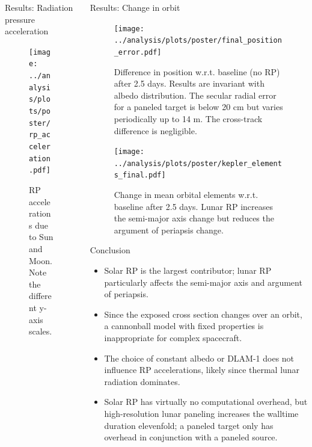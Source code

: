 \documentclass[final,20pt]{beamer}
\begin{document}
\begin{frame}[t]
\begin{columns}[t]
\begin{column}{\colwidth}
\begin{block}{Results: Radiation pressure acceleration}
    \begin{figure}[h]
      \centering
      \texttt{[image: ../analysis/plots/poster/rp\_acceleration.pdf]}
      \caption{RP accelerations due to Sun and Moon. Note the different y-axis scales.}
      \label{fig:acc}
    \end{figure}

  \end{block}

\end{column}

\separatorcolumn

\begin{column}{\colwidth}

  \begin{alertblock}{Results: Change in orbit}

    \begin{figure}[h]
      \centering
      \texttt{[image: ../analysis/plots/poster/final\_position\_error.pdf]}
      \caption{Difference in position w.r.t. baseline (no RP) after 2.5 days. Results are invariant with albedo distribution. The secular radial error for a paneled target is below 20 cm but varies periodically up to 14 m. The cross-track difference is negligible. }
      \label{fig:error}
    \end{figure}
    \begin{figure}[h]
      \centering
      \texttt{[image: ../analysis/plots/poster/kepler\_elements\_final.pdf]}
      \caption{Change in mean orbital elements w.r.t. baseline after 2.5 days. Lunar RP increases the semi-major axis change but reduces the argument of periapsis change.}
      \label{fig:kepler}
    \end{figure}

  \end{alertblock}

  \begin{block}{Conclusion}

    \begin{itemize}
      \item Solar RP is the largest contributor; lunar RP particularly affects the semi-major axis and argument of periapsis.
      \item Since the exposed cross section changes over an orbit, a cannonball model with fixed properties is inappropriate for complex spacecraft.
      \item The choice of constant albedo or DLAM-1 does not influence RP accelerations, likely since thermal lunar radiation dominates.
      \item Solar RP has virtually no computational overhead, but high-resolution lunar paneling increases the walltime duration elevenfold; a paneled target only has overhead in conjunction with a paneled source.
    \end{itemize}



\end{block}
\end{column}
\end{columns}
\end{frame}
\end{document}
